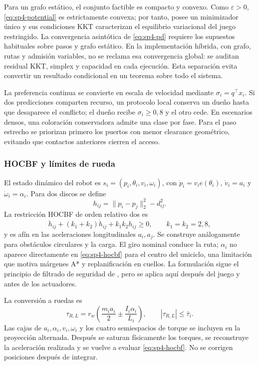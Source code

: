 Para un grafo estático, el conjunto factible es compacto y convexo. Como
$\varepsilon>0$, \eqref{eq:sp4-potential} es estrictamente convexa; por tanto, posee un
minimizador único y sus condiciones KKT caracterizan el equilibrio variacional del
juego restringido. La convergencia asintótica de \eqref{eq:sp4-pd} requiere los
supuestos habituales sobre pasos y grafo estático. En la implementación híbrida, con
grafo, rutas y admisión variables, no se reclama esa convergencia global: se auditan
residual KKT, simplex y capacidad en cada ejecución. Esta separación evita convertir
un resultado condicional en un teorema sobre todo el sistema.

La preferencia continua se convierte en escala de velocidad mediante
$\sigma_i=q^\top x_i$. Si dos predicciones comparten recurso, un protocolo local conserva
un dueño hasta que desaparece el conflicto; el dueño recibe
$\sigma_i\geq0{,}8$ y el otro cede. En escenarios densos, una coloración conservadora
admite una clase por fase. Para el paso estrecho se priorizan primero los puertos con
menor clearance geométrico, evitando que contactos anteriores cierren el acceso.

\subsubsection{HOCBF y límites de rueda}

El estado dinámico del robot es
$s_i=(p_i,\theta_i,v_i,\omega_i)$, con
$\dot p_i=v_ie(\theta_i)$, $\dot v_i=a_i$ y
$\dot\omega_i=\alpha_i$. Para dos discos se define
\begin{equation}
 h_{ij}=\lVert p_i-p_j\rVert_2^2-d_{ij}^2.
 \label{eq:sp4-hij}
\end{equation}
La restricción HOCBF de orden relativo dos es
\begin{equation}
 \ddot h_{ij}+(k_1+k_2)\dot h_{ij}+k_1k_2h_{ij}\geq0,
 \qquad k_1=k_2=2{,}8,
 \label{eq:sp4-hocbf}
\end{equation}
y es afín en las aceleraciones longitudinales $a_i,a_j$. Se construye análogamente
para obstáculos circulares y la carga. El giro nominal conduce la ruta; $\alpha_i$ no
aparece directamente en \eqref{eq:sp4-hocbf} para el centro del uniciclo, una limitación
que motiva márgenes A* y replanificación en cuellos. La formulación sigue el principio
de filtrado de seguridad de \citet{ames2017cbf}, pero se aplica aquí después del juego y
antes de los actuadores.

La conversión a ruedas es
\begin{equation}
 \tau_{R,L}=r_w\left(\frac{m_ia_i}{2}
 \pm\frac{I_i\alpha_i}{L_i}\right),
 \qquad |\tau_{R,L}|\leq\bar\tau_i.
 \label{eq:sp4-wheel-torque}
\end{equation}
Las cajas de $a_i,\alpha_i,v_i,\omega_i$ y los cuatro semiespacios de torque se incluyen
en la proyección alternada. Después se saturan físicamente los torques, se reconstruye
la aceleración realizada y se vuelve a evaluar \eqref{eq:sp4-hocbf}. No se corrigen
posiciones después de integrar.

